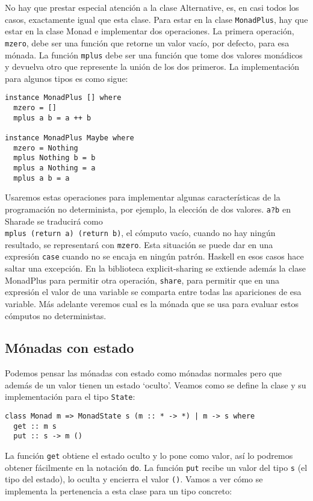 \documentclass[class=article, crop=false]{standalone}
\begin{document}
No hay que prestar especial atención a la clase Alternative, es, en casi todos los casos,
exactamente igual que esta clase. Para estar en la clase \verb`MonadPlus`, hay que estar en
la clase Monad e implementar dos operaciones. La primera operación, \verb`mzero`, debe ser
una función que retorne un valor vacío, por defecto, para esa mónada. La función \verb`mplus`
debe ser una función que tome dos valores monádicos y devuelva otro que represente la unión
de los dos primeros. La implementación para algunos tipos es como sigue:

\begin{verbatim}
instance MonadPlus [] where
  mzero = []
  mplus a b = a ++ b

instance MonadPlus Maybe where
  mzero = Nothing
  mplus Nothing b = b
  mplus a Nothing = a
  mplus a b = a
\end{verbatim}

Usaremos estas operaciones para implementar algunas características de la programación no
determinista, por ejemplo, la elección de dos valores. \verb`a?b` en Sharade se traducirá
como \\ \verb`mplus (return a) (return b)`, el cómputo vacío, cuando no hay ningún resultado,
se representará con \verb`mzero`. Esta situación se puede dar en una expresión \verb`case`
cuando no se encaja en ningún patrón. Haskell en esos casos hace saltar una excepción. En la
biblioteca explicit-sharing se extiende además la clase MonadPlus para permitir otra
operación, \verb`share`, para permitir que en una expresión el valor de una variable se
comparta entre todas las apariciones de esa variable. Más adelante veremos cual es la mónada
que se usa para evaluar estos cómputos no deterministas.

\subsection{Mónadas con estado}
Podemos pensar las mónadas con estado como mónadas normales pero que además de un valor
tienen un estado `oculto'. Veamos como se define la clase y su implementación para el tipo
\verb`State`:

\begin{verbatim}
class Monad m => MonadState s (m :: * -> *) | m -> s where
  get :: m s
  put :: s -> m ()
\end{verbatim}

La función \verb`get` obtiene el estado oculto y lo pone como valor, así lo podremos
obtener fácilmente en la notación \verb`do`. La función \verb`put` recibe un valor del tipo
\verb`s` (el tipo del estado), lo oculta y encierra el valor \verb`()`. Vamos a ver cómo se
implementa la pertenencia a esta clase para un tipo concreto:
\end{document}
